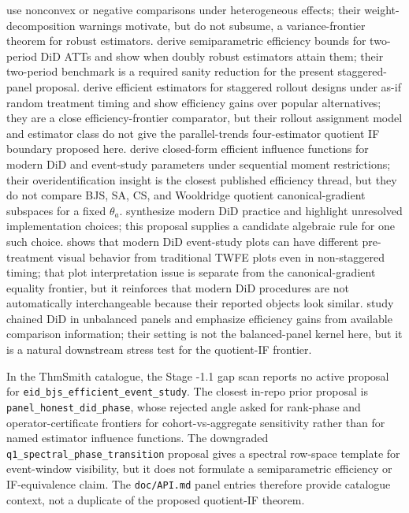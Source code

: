 \documentclass[11pt]{article}
\theoremstyle{definition}
\theoremstyle{plain}
\theoremstyle{remark}
\begin{document}
use nonconvex or negative comparisons under heterogeneous effects; their weight-decomposition
warnings motivate, but do not subsume, a variance-frontier theorem for robust estimators.
\citet{SantAnnaZhao2020} derive semiparametric efficiency bounds for two-period DiD ATTs and show
when doubly robust estimators attain them; their two-period benchmark is a required sanity reduction
for the present staggered-panel proposal.
\citet{RothSantAnna2021Efficient} derive efficient estimators for staggered rollout designs under
as-if random treatment timing and show efficiency gains over popular alternatives; they are a close
efficiency-frontier comparator, but their rollout assignment model and estimator class do not give
the parallel-trends four-estimator quotient IF boundary proposed here.
\citet{ChenSantAnnaXie2025} derive closed-form efficient influence functions for modern DiD and
event-study parameters under sequential moment restrictions; their overidentification insight is the
closest published efficiency thread, but they do not compare BJS, SA, CS, and Wooldridge quotient
canonical-gradient subspaces for a fixed \(\theta_a\).
\citet{RothSantAnnaBilinskiPoe2023} synthesize modern DiD practice and highlight unresolved
implementation choices; this proposal supplies a candidate algebraic rule for one such choice.
\citet{Roth2026Interpreting} shows that modern DiD event-study plots can have different
pre-treatment visual behavior from traditional TWFE plots even in non-staggered timing; that plot
interpretation issue is separate from the canonical-gradient equality frontier, but it reinforces
that modern DiD procedures are not automatically interchangeable because their reported objects look
similar.
\citet{BellegoBenatiaDortetBernadet2025} study chained DiD in unbalanced panels and emphasize
efficiency gains from available comparison information; their setting is not the balanced-panel
kernel here, but it is a natural downstream stress test for the quotient-IF frontier.

In the ThmSmith catalogue, the Stage -1.1 gap scan reports no active proposal for
\texttt{eid\_bjs\_efficient\_event\_study}.  The closest in-repo prior proposal is
\texttt{panel\_honest\_did\_phase}, whose rejected angle asked for rank-phase and operator-certificate
frontiers for cohort-vs-aggregate sensitivity rather than for named estimator influence functions.
The downgraded \texttt{q1\_spectral\_phase\_transition} proposal gives a spectral row-space template
for event-window visibility, but it does not formulate a semiparametric efficiency or IF-equivalence
claim.  The \texttt{doc/API.md} panel entries therefore provide catalogue context, not a duplicate of
the proposed quotient-IF theorem.
\end{document}

